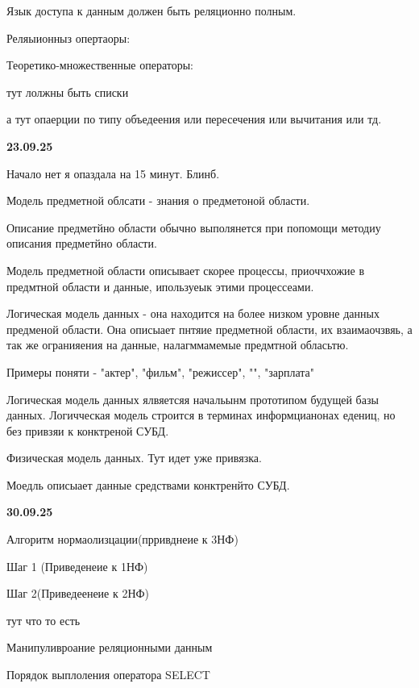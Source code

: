 \documentclass{article}
\begin{document}
Язык доступа к данным должен быть реляционно полным.

Реляыионныз опертаоры:

Теоретико-множественные операторы:

тут лолжны быть списки 



а тут опаерции по типу объедеения или пересечения или вычитания или тд. 


\textbf{23.09.25}

Начало нет я опаздала на 15 минут. Блинб.

Модель предметной облсати - знания о предметоной области.

Описание предметйно области обычно выполянется при попомощи методиу описания предметйно области.

Модель предметной области описывает скорее процессы, приоччхожие в предмтной области и данные, 
ипользуеык этими процессеами.

Логическая модель данных - она находится на более низком уровне данных предменой области.
Она описыает пнтяие предметной области, их взаимаочзвяь, а так же огранияения на данные, налагммамемые предмтной обласьтю. 

Примеры поняти - "актер", "фильм", "режиссер", "", "зарплата"

Логическая модель данных ялвяетсяя начальынм прототипом будущей базы данных. Логичческая модель строится в терминах 
информцианонах едениц, но без привзяи к конктреной СУБД.

Физическая модель данных. Тут идет уже привязка. 

Моедль описыает данные средствами конктренйто СУБД.

\textbf{30.09.25}

Алгоритм нормаолизцации(прривднеие к 3НФ)

Шаг 1 (Приведенеие к 1НФ)

Шаг 2(Приведеенеие к 2НФ)

тут что то есть 

Манипуливроание реляционными данным 

Порядок выплоления оператора SELECT
\end{document}

